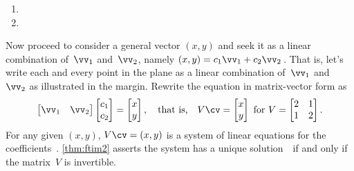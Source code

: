 \begin{example}
\begin{solution}
\begin{enumerate}
\item {}

\item {}

\end{enumerate}

Now proceed to consider a general vector \((x,y)\) and seek it as a linear combination of~\(\vv_1\) and~\(\vv_2\), namely \((x,y)=c_1\vv_1+c_2\vv_2\)\,.
That is, let's write each and every point in the plane as a linear combination of~\(\vv_1\) and~\(\vv_2\) as illustrated in the margin.
%
Rewrite the equation in matrix-vector form as
\begin{equation*}
\begin{bmatrix} \vv_1&\vv_2 \end{bmatrix}
\begin{bmatrix} c_1\\c_2 \end{bmatrix}
=\begin{bmatrix} x\\y \end{bmatrix}
,\quad\text{that is,}\quad
V\cv=\begin{bmatrix} x\\y \end{bmatrix}
\text{ for }V=\begin{bmatrix} 2&1\\1&2 \end{bmatrix}.
\end{equation*}
For any given \((x,y)\), \(V\cv=(x,y)\) is a system of linear equations for the coefficients~\cv.
\cref{thm:ftim2} asserts the system has a unique solution~\cv\ if and only if the matrix~\(V\) is invertible.

\end{solution}
\end{example}

